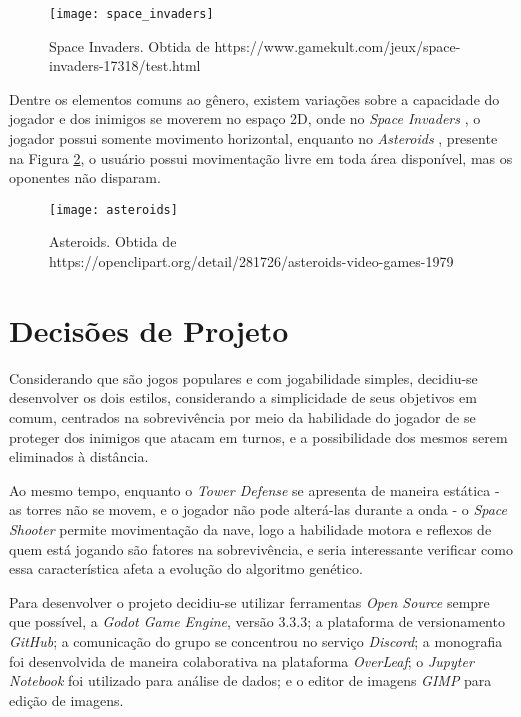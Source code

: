 \begin{figure}
  \centering
  \texttt{[image: space\_invaders]}
  \caption{Space Invaders. Obtida de https://www.gamekult.com/jeux/space-invaders-17318/test.html\label{fig:space-invaders}}
\end{figure}

Dentre os elementos comuns ao gênero, existem variações sobre a capacidade do jogador e dos inimigos se moverem no espaço 2D, onde no \textit{Space Invaders} \citep{Space_Invaders}, o jogador possui somente movimento horizontal, enquanto no \textit{Asteroids} \citep{Asteroids}, presente na Figura \ref{fig:asteroids}, o usuário possui movimentação livre em toda área disponível, mas os oponentes não disparam.

\begin{figure}
  \centering
  \texttt{[image: asteroids]}
  \caption{Asteroids. Obtida de https://openclipart.org/detail/281726/asteroids-video-games-1979\label{fig:asteroids}}
\end{figure}

\section{Decisões de Projeto}
\label{sec:jogos-decisoes}

Considerando que são jogos populares e com jogabilidade simples, decidiu-se desenvolver os dois estilos, considerando a simplicidade de seus objetivos em comum, centrados na sobrevivência por meio da habilidade do jogador de se proteger dos inimigos que atacam em turnos, e a possibilidade dos mesmos serem eliminados à distância.

Ao mesmo tempo, enquanto o \textit{Tower Defense} se apresenta de maneira estática - as torres não se movem, e o jogador não pode alterá-las durante a onda - o \textit{Space Shooter} permite movimentação da nave, logo a habilidade motora e reflexos de quem está jogando são fatores na sobrevivência, e seria interessante verificar como essa característica afeta a evolução do algoritmo genético.

Para desenvolver o projeto decidiu-se utilizar ferramentas \textit{Open Source} sempre que possível, a \textit{Godot Game Engine}, versão 3.3.3; a plataforma de versionamento \textit{GitHub}; a comunicação do grupo se concentrou no serviço \textit{Discord}; a monografia foi desenvolvida de maneira colaborativa na plataforma \textit{OverLeaf}; o \textit{Jupyter Notebook} foi utilizado para análise de dados; e o editor de imagens \textit{GIMP} para edição de imagens.
